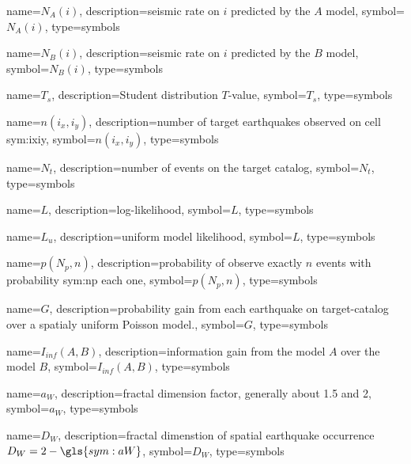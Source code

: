 {
	name={\ensuremath{N_A(i)}},
	description={seismic rate on $i$ predicted by the $A$ model}, 
	symbol={\ensuremath{N_A(i)}},
	type=symbols
}


{
	name={\ensuremath{N_B(i)}},
	description={seismic rate on $i$ predicted by the $B$ model},
	symbol={\ensuremath{N_B(i)}},
	type=symbols
}


{
	name={\ensuremath{T_s}},
	description={Student distribution $T$-value},
	symbol={\ensuremath{T_s}},
	type=symbols
}

{
	name={\ensuremath{n\left(i_x, i_y\right)}},
	description={number of target earthquakes observed on cell \gls{sym:ixiy}},
	symbol={\ensuremath{n\left(i_x, i_y\right)}},
	type=symbols
}


{
	name={\ensuremath{N_t}},
	description={number of events on the target catalog},
	symbol={\ensuremath{N_t}},
	type=symbols
}



{
	name={\ensuremath{L}},
	description={log-likelihood},
	symbol={\ensuremath{L}},
	type=symbols
}


{
	name={\ensuremath{L_u}},
	description={uniform model likelihood},
	symbol={\ensuremath{L}},
	type=symbols
}


{
	name={\ensuremath{p(N_p, n)}},
	description={probability of observe exactly $n$ events with probability \gls{sym:np} each one},
	symbol={\ensuremath{p(N_p, n)}},
	type=symbols
}


{
	name={\ensuremath{G}},
	description={probability gain from each earthquake on target-catalog over a spatialy uniform Poisson model.}, 
	symbol={\ensuremath{G}}, 
	type=symbols
}


{
	name={\ensuremath{ I_{inf}(A,B)}},
	description={information gain from the model $A$ over the model $B$}, 
	symbol={\ensuremath{I_{inf}(A,B)}}, 
	type=symbols
}


{
	name={\ensuremath{a_W}},
	description={fractal dimension factor, generally about 1.5 and 2}, 
	symbol={\ensuremath{a_W}}, 
	type=symbols
}



{
	name={\ensuremath{D_W}},
	description={fractal dimenstion of spatial earthquake occurrence $D_W = 2-\gls{sym:aW}$}, 
	symbol={\ensuremath{D_W}}, 
	type=symbols
}



